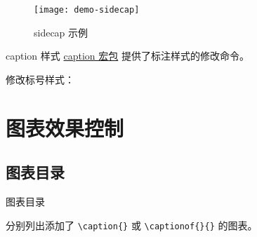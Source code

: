 \documentclass[]{ctexbeamer}
\begin{document}
\begin{frame}[fragile]
\end{frame}

\captionsetup[figure]{name=边注图}

\begin{frame}
\begin{figure}[]
  \centering
  \texttt{[image: demo-sidecap]}
  \caption{sidecap 示例}
  \label{demo-sidecap}
\end{figure}
\end{frame}

\captionsetup[figure]{name=图}

\begin{frame}[fragile]{caption 样式}
\href{http://www.ctan.org/pkg/caption}{caption 宏包} \cite{caption} 提供了标注样式的修改命令。
\begin{texlst}[numbers=none]
\usepackage{caption}
\captionsetup[figure]{name=边注图}
\end{texlst}
修改标号样式：
\begin{texlst}[numbers=none]
\renewcommand{\thefigure}{\arabic{section}.\roman{figure}}
\end{texlst}
\end{frame}



\section{图表效果控制}
\subsection{图表目录}
% 
\begin{frame}[fragile]{图表目录}
\begin{texlst}[numbers=none]
\listoffigures
\listoftables
\end{texlst}
分别列出添加了 \verb+\caption{}+ 或 \verb+\captionof{}{}+ 的图表。
\end{frame}


\end{document}

